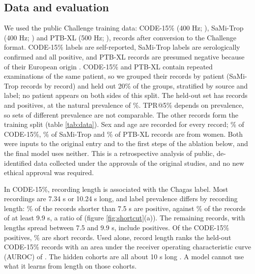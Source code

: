 \documentclass{iopjournal}
\makeatletter
\newcommand{\tpr}{TPR@5\%}
\makeatother
\begin{document}
\subsection{Data and evaluation}
\label{sec:data}
We used the public Challenge training data: CODE-15\% (400 Hz; \citealp{code15data}), SaMi-Trop (400 Hz; \citealp{samitropdata}) and PTB-XL (500 Hz; \citealp{ptbxldata}), \nAll{} records after conversion to the Challenge format. CODE-15\% labels are self-reported, SaMi-Trop labels are serologically confirmed and all positive, and PTB-XL records are presumed negative because of their European origin \citep{reyna2025}. CODE-15\% and PTB-XL contain repeated examinations of the same patient, so we grouped their records by patient (SaMi-Trop records by record) and held out 20\% of the groups, stratified by source and label; no patient appears on both sides of this split. The held-out set has \nTest{} records and \nTestPos{} positives, at the natural prevalence of \testPrev\%. \tpr{} depends on prevalence, so sets of different prevalence are not comparable. The other \nTrain{} records form the training split (table \ref{tab:data}). Sex and age are recorded for every record; \sexFemaleCode\% of CODE-15\%, \sexFemaleSami\% of SaMi-Trop and \sexFemalePtb\% of PTB-XL records are from women. Both were inputs to the original entry and to the first steps of the ablation below, and the final model uses neither. This is a retrospective analysis of public, de-identified data collected under the approvals of the original studies, and no new ethical approval was required.

\begin{table}
\caption{Records by source and length. Most CODE-15\% records are 7.34 s (first group) or 10.24 s (third group) long; the 7.5--9.9 s group holds the \nCodeMid{} CODE-15\% records of intermediate lengths, and the \nCodeUnderFive{} CODE-15\% records shorter than 5 s fall in the first group.}
\centering
\small

\label{tab:data}
\end{table}

In CODE-15\%, recording length is associated with the Chagas label. Most recordings are 7.34 s or 10.24 s long, and label prevalence differs by recording length: \prevShort\% of the \nCodeShort{} records shorter than 7.5 s are positive, against \prevLong\% of the \nCodeLong{} records of at least 9.9 s, a ratio of \prevRatio{} (figure \ref{fig:shortcut}(a)). The remaining \nCodeMid{} records, with lengths spread between 7.5 and 9.9 s, include \nCodeMidPos{} positives. Of the CODE-15\% positives, \shareCodePosShort\% are short records. Used alone, record length ranks the held-out CODE-15\% records with an area under the receiver operating characteristic curve (AUROC) of \durOnlyB. The hidden cohorts are all about 10 s long \citep{reyna2025}. A model cannot use what it learns from length on those cohorts.
\end{document}

